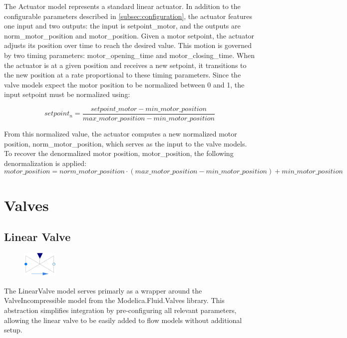 \documentclass[we,final,11pt,oneside,openany]{uantwerpenbamathesis}
\begin{document}
The Actuator model represents a standard linear actuator.
In addition to the configurable parameters described in \autoref{subsec:configuration}, the actuator features one input and two outputs: the input is setpoint\_motor, and the outputs are norm\_motor\_position and motor\_position.
Given a motor setpoint, the actuator adjusts its position over time to reach the desired value.
This motion is governed by two timing parameters: motor\_opening\_time and motor\_closing\_time.
When the actuator is at a given position and receives a new setpoint, it transitions to the new position at a rate proportional to these timing parameters.
Since the valve models expect the motor position to be normalized between 0 and 1, the input setpoint must be normalized using:

\[
setpoint_n = \frac{setpoint\_motor - min\_motor\_position}{max\_motor\_position - min\_motor\_position}
\]

From this normalized value, the actuator computes a new normalized motor position, norm\_motor\_position, which serves as the input to the valve models.
To recover the denormalized motor position, motor\_position, the following denormalization is applied:
\[
motor\_position = norm\_motor\_position \cdot (max\_motor\_position - min\_motor\_position) + min\_motor\_position
\]


\section{Valves}
\label{sec:valves}

\subsection{Linear Valve}
\label{subsec:linear-valve}

\begin{figure}
    \centering
    \includegraphics[width=0.15\textwidth]{Images/components/linear-valve}
\end{figure}

The LinearValve model serves primarly as a wrapper around the ValveIncompressible model from the Modelica.Fluid.Valves library.
This abstraction simplifies integration by pre-configuring all relevant parameters, allowing the linear valve to be easily added to flow models without additional setup.
\end{document}

